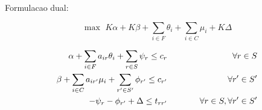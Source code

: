 \documentclass[12pt]{article}
\begin{document}
\newpage
\noindent Formulacao dual: \vspace{5mm}

\[
\max \,\, K \alpha + K \beta + \sum\limits_{i \in F}{\theta_i} + \sum\limits_{i \in C}{\mu_i} + K \Delta
\]

\begin{small}
\begin{eqnarray}
\label{eqC01}
  \alpha + \sum\limits_{i \in F}{a_{ir} \theta_i} + \sum\limits_{r \in S}{\psi_r} \le c_r & \hspace{1cm} & \forall r \in S \\
\label{eqC02}
  \beta + \sum\limits_{i \in C}{a_{ir'} \mu_i} + \sum\limits_{r' \in S'}{\phi_{r'}} \le c_{r'} & \hspace{1cm} & \forall r' \in S' \\
\label{eqC03}
  -\psi_r - \phi_{r'} + \Delta \le t_{rr'} & \hspace{5mm} & \forall r \in S, \forall r' \in S'
\end{eqnarray}
\end{small}
\end{document}
